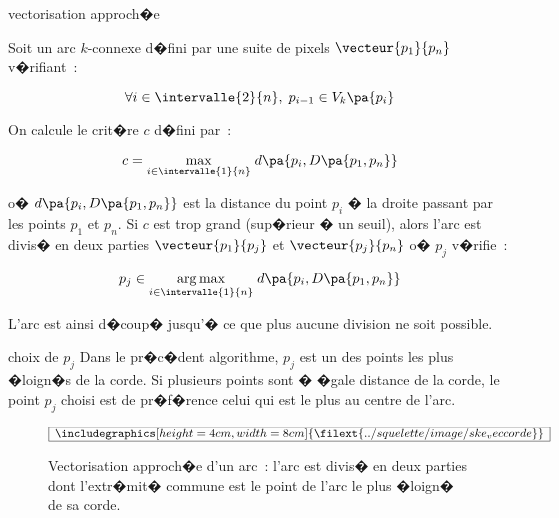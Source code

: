         \begin{xalgorithm}{vectorisation approch�e}
        \label{algo_vecto_appro}
        
        Soit un arc $k$-connexe d�fini par une suite de pixels $\vecteur{p_1}{p_n}$ v�rifiant~:
        
                    $$
                  \forall i \in \intervalle{2}{n}, \; p_{i-1} \in V_k\pa{p_i}
                    $$
        
        On calcule le crit�re $c$ d�fini par~:
        
                    $$
                    c = \underset{i \in \intervalle{1}{n} }{\max} \;  d\pa{p_i, D\pa{p_1,p_n} }
                    $$
        
        o� $d\pa{p_i, D\pa{p_1,p_n}}$ est la distance du point $p_i$ � la droite passant par les points $p_1$ et
        $p_n$. Si $c$ est trop grand (sup�rieur � un seuil), alors l'arc est divis� en deux parties
        $\vecteur{p_1}{p_j}$ et $\vecteur{p_j}{p_n}$ o� $p_j$ v�rifie~:
        
                    $$
                    p_j \in \underset{i \in \intervalle{1}{n} }{\arg \max} \;  d\pa{p_i, D\pa{p_1,p_n} } \\
                    $$
                    
        L'arc est ainsi d�coup� jusqu'� ce que plus aucune division ne soit possible.
        
        \end{xalgorithm}


\begin{xremark}{choix de $p_j$}
Dans le pr�c�dent algorithme, $p_j$ est un des points les plus �loign�s de la corde. Si plusieurs points sont � �gale distance de la corde, le point $p_j$ choisi est de pr�f�rence celui qui est le plus au centre de l'arc.
\end{xremark}



            \begin{figure}[ht]
        $$\frame{$\begin{array}[c]{c}\includegraphics[height=4cm, width=8cm]
        {\filext{../squelette/image/ske_veccorde}}\end{array}$}$$
        \caption{Vectorisation approch�e d'un arc~: l'arc est divis� en deux parties dont l'extr�mit�
                            commune est le point de l'arc le plus �loign� de sa corde.}
        \label{squelette_vector_corde}
            \end{figure}


